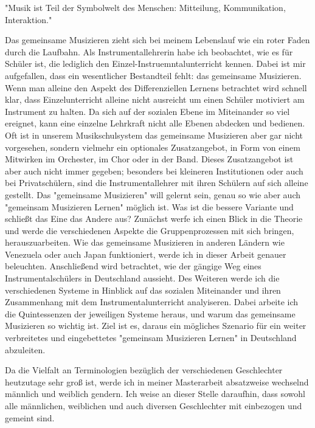 
"Musik ist Teil der Symbolwelt des Menschen: Mitteilung, Kommunikation,
Interaktion." \autocite[91]{doerne:umfassend_musizieren}

Das gemeinsame Musizieren zieht sich bei meinem Lebenslauf wie ein roter Faden
durch die Laufbahn. Als Instrumentallehrerin habe ich beobachtet, wie es für
Schüler ist, die lediglich den Einzel-Instruemntalunterricht kennen. Dabei ist
mir aufgefallen, dass ein wesentlicher Bestandteil fehlt: das gemeinsame
Musizieren. Wenn man alleine den Aspekt des Differenziellen Lernens betrachtet
wird schnell klar, dass Einzelunterricht alleine nicht ausreicht um einen
Schüler motiviert am Instrument zu halten. Da sich auf der sozialen Ebene im
Miteinander so viel ereignet, kann eine einzelne Lehrkraft nicht alle Ebenen
abdecken und bedienen. Oft ist in unserem Musikschulsystem das gemeinsame
Musizieren aber gar nicht vorgesehen, sondern vielmehr ein optionales
Zusatzangebot, in Form von einem Mitwirken im Orchester, im Chor oder in der
Band. Dieses Zusatzangebot ist aber auch nicht immer gegeben; besonders bei
kleineren Institutionen oder auch bei Privatschülern, sind die
Instrumentallehrer mit ihren Schülern auf sich alleine gestellt. Das "gemeinsame
Musizieren" will gelernt sein, genau so wie aber auch "gemeinsam Musizieren
Lernen" möglich ist. Was ist die bessere Variante und schließt das Eine das
Andere aus? Zunächst werfe ich einen Blick in die Theorie und werde die
verschiedenen Aspekte die Gruppenprozessen mit sich bringen, herauszuarbeiten.
Wie das gemeinsame Musizieren in anderen Ländern wie Venezuela oder auch Japan
funktioniert, werde ich in dieser Arbeit genauer beleuchten. Anschließend wird
betrachtet, wie der gängige Weg eines Instrumentalschülers in Deutschland
aussieht. Des Weiteren werde ich die verschiedenen Systeme in Hinblick auf das
sozialen Miteinander und ihren Zusammenhang mit dem Instrumentalunterricht
analyiseren. Dabei arbeite ich die Quintessenzen der jeweiligen Systeme heraus,
und warum das gemeinsame Musizieren so wichtig ist. Ziel ist es, daraus ein
mögliches Szenario für ein weiter verbreitetes und eingebettetes "gemeinsam
Musizieren Lernen" in Deutschland abzuleiten.


Da die Vielfalt an Terminologien bezüglich der verschiedenen Geschlechter
heutzutage sehr groß ist, werde ich in meiner Masterarbeit
absatzweise wechselnd männlich und weiblich gendern. Ich weise an dieser Stelle
daraufhin, dass sowohl alle männlichen, weiblichen und auch diversen
Geschlechter mit einbezogen und gemeint sind. 
